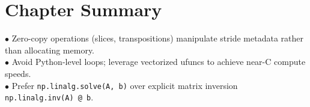 \section{Chapter Summary}
\begin{summarybox}
$\bullet$ Zero-copy operations (slices, transpositions) manipulate stride metadata rather than allocating memory.\\
$\bullet$ Avoid Python-level loops; leverage vectorized ufuncs to achieve near-C compute speeds.\\
$\bullet$ Prefer \texttt{np.linalg.solve(A, b)} over explicit matrix inversion \texttt{np.linalg.inv(A) @ b}.
\end{summarybox}
